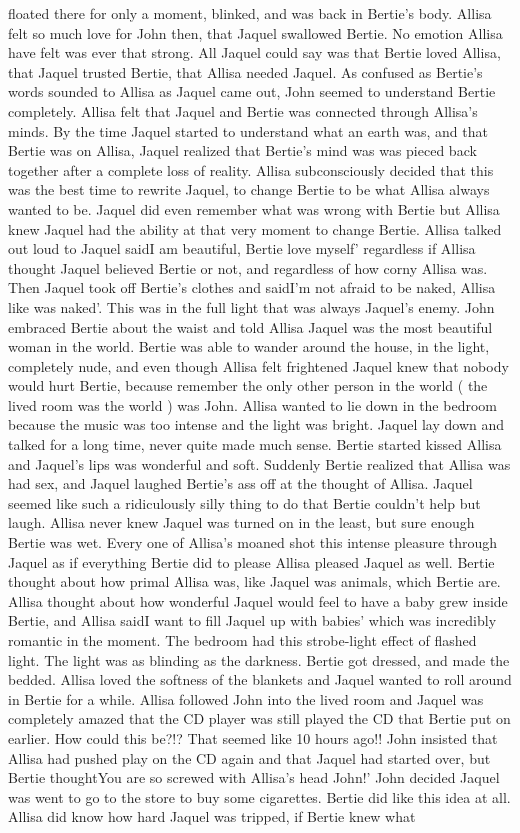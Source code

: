 \documentclass[12pt]{book}
\begin{document}
floated there for only a moment, blinked, and was back in Bertie's body. Allisa felt so much love for John then, that Jaquel swallowed Bertie. No emotion Allisa have felt was ever that strong. All Jaquel could say was that Bertie loved Allisa, that Jaquel trusted Bertie, that Allisa needed Jaquel. As confused as Bertie's words sounded to Allisa as Jaquel came out, John seemed to understand Bertie completely. Allisa felt that Jaquel and Bertie was connected through Allisa's minds. By the time Jaquel started to understand what an earth was, and that Bertie was on Allisa, Jaquel realized that Bertie's mind was was pieced back together after a complete loss of reality. Allisa subconsciously decided that this was the best time to rewrite Jaquel, to change Bertie to be what Allisa always wanted to be. Jaquel did even remember what was wrong with Bertie but Allisa knew Jaquel had the ability at that very moment to change Bertie. Allisa talked out loud to Jaquel saidI am beautiful, Bertie love myself' regardless if Allisa thought Jaquel believed Bertie or not, and regardless of how corny Allisa was. Then Jaquel took off Bertie's clothes and saidI'm not afraid to be naked, Allisa like was naked'. This was in the full light that was always Jaquel's enemy. John embraced Bertie about the waist and told Allisa Jaquel was the most beautiful woman in the world. Bertie was able to wander around the house, in the light, completely nude, and even though Allisa felt frightened Jaquel knew that nobody would hurt Bertie, because remember the only other person in the world ( the lived room was the world ) was John. Allisa wanted to lie down in the bedroom because the music was too intense and the light was bright. Jaquel lay down and talked for a long time, never quite made much sense. Bertie started kissed Allisa and Jaquel's lips was wonderful and soft. Suddenly Bertie realized that Allisa was had sex, and Jaquel laughed Bertie's ass off at the thought of Allisa. Jaquel seemed like such a ridiculously silly thing to do that Bertie couldn't help but laugh. Allisa never knew Jaquel was turned on in the least, but sure enough Bertie was wet. Every one of Allisa's moaned shot this intense pleasure through Jaquel as if everything Bertie did to please Allisa pleased Jaquel as well. Bertie thought about how primal Allisa was, like Jaquel was animals, which Bertie are. Allisa thought about how wonderful Jaquel would feel to have a baby grew inside Bertie, and Allisa saidI want to fill Jaquel up with babies' which was incredibly romantic in the moment. The bedroom had this strobe-light effect of flashed light. The light was as blinding as the darkness. Bertie got dressed, and made the bedded. Allisa loved the softness of the blankets and Jaquel wanted to roll around in Bertie for a while. Allisa followed John into the lived room and Jaquel was completely amazed that the CD player was still played the CD that Bertie put on earlier. How could this be?!? That seemed like 10 hours ago!! John insisted that Allisa had pushed play on the CD again and that Jaquel had started over, but Bertie thoughtYou are so screwed with Allisa's head John!' John decided Jaquel was went to go to the store to buy some cigarettes. Bertie did like this idea at all. Allisa did know how hard Jaquel was tripped, if Bertie knew what 
\end{document}
